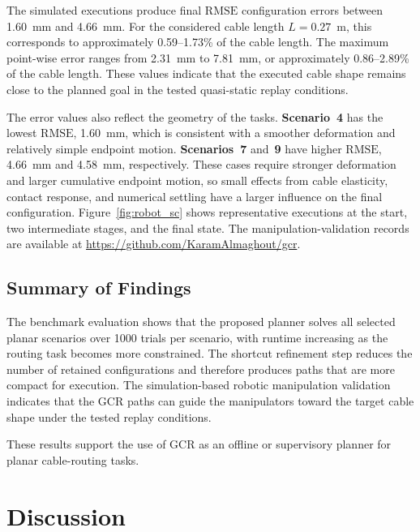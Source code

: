 \documentclass{pas}
\begin{document}
The simulated executions produce final \(\mathrm{RMSE}\) configuration errors between 1.60~mm and 4.66~mm.
For the considered cable length $L=0.27$~m, this corresponds to approximately 0.59--1.73\% of the cable length.
The maximum point-wise error ranges from 2.31~mm to 7.81~mm, or approximately 0.86--2.89\% of the cable length.
These values indicate that the executed cable shape remains close to the planned goal in the tested quasi-static replay conditions.

The error values also reflect the geometry of the tasks.
\textbf{Scenario~4} has the lowest \(\mathrm{RMSE}\), 1.60~mm, which is consistent with a smoother deformation and relatively simple endpoint motion.
\textbf{Scenarios~7} and~\textbf{9} have higher \(\mathrm{RMSE}\), 4.66~mm and 4.58~mm, respectively.
These cases require stronger deformation and larger cumulative endpoint motion, so small effects from cable elasticity, contact response, and numerical settling have a larger influence on the final configuration. Figure~\ref{fig:robot_sc} shows representative executions at the start, two intermediate stages, and the final state. The manipulation-validation records are available at \url{https://github.com/KaramAlmaghout/gcr}.



\subsection{Summary of Findings}
\label{subsec:simulation_summary}

The benchmark evaluation shows that the proposed planner solves all selected planar scenarios over 1000 trials per scenario, with runtime increasing as the routing task becomes more constrained.
The shortcut refinement step reduces the number of retained configurations and therefore produces paths that are more compact for execution.
The simulation-based robotic manipulation validation indicates that the GCR paths can guide the manipulators toward the target cable shape under the tested replay conditions.

These results support the use of GCR as an offline or supervisory planner for planar cable-routing tasks.
\section{Discussion}
\label{sec:discussion}
\end{document}
